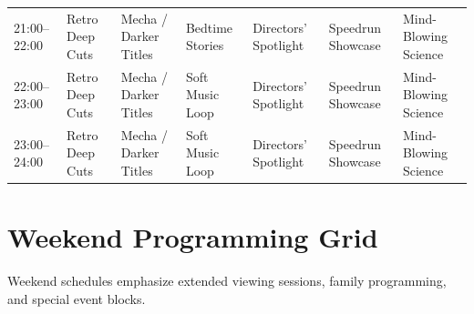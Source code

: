 \documentclass[12pt,letterpaper,twoside]{report}
\begin{document}
\begin{landscape}
\begin{longtable}{@{}L{2.4cm}L{2.65cm}L{2.65cm}L{2.65cm}L{2.65cm}L{2.65cm}L{2.65cm}@{}}
21:00--22:00 & Retro Deep Cuts & Mecha / Darker Titles & Bedtime Stories & Directors' Spotlight & Speedrun Showcase & Mind-Blowing Science \\
22:00--23:00 & Retro Deep Cuts & Mecha / Darker Titles & Soft Music Loop & Directors' Spotlight & Speedrun Showcase & Mind-Blowing Science \\
23:00--24:00 & Retro Deep Cuts & Mecha / Darker Titles & Soft Music Loop & Directors' Spotlight & Speedrun Showcase & Mind-Blowing Science \\
\end{longtable}
\end{landscape}

\section{Weekend Programming Grid}

Weekend schedules emphasize extended viewing sessions, family programming, and special event blocks.
\end{document}
